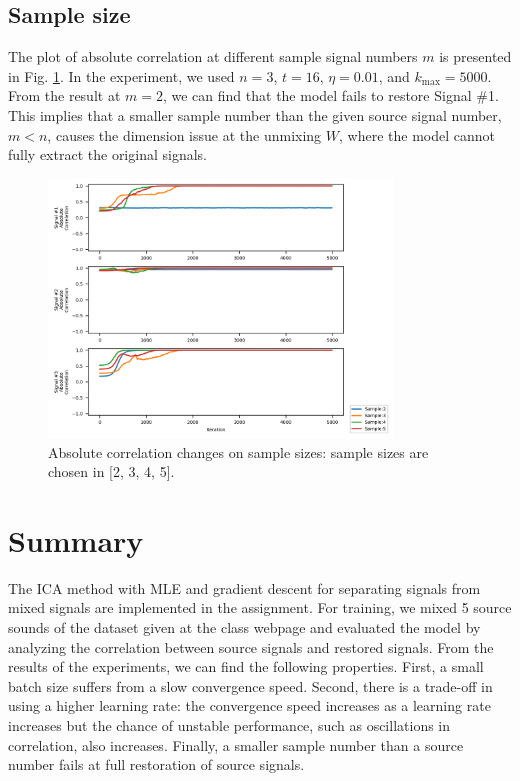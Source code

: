 \documentclass[conference]{IEEEtran}
\begin{document}
\subsection{Sample size}

The plot of absolute correlation at different sample signal numbers $m$ is presented in Fig. \ref{fig:sample_abs_test}.
In the experiment, we used $n=3$, $t=16$, $\eta=0.01$, and $k_{\text{max}} = 5000$.
From the result at $m=2$, we can find that the model fails to restore Signal \#1. This implies that a smaller sample number than the given source signal number, $m<n$, causes the dimension issue at the unmixing $W$, where the model cannot fully extract the original signals.

\begin{figure}[!t]
	\centering
	\includegraphics[width=3.6in]{sample_abs_test.png}	
	\caption{Absolute correlation changes on sample sizes: sample sizes are chosen in [2, 3, 4, 5].}
	\label{fig:sample_abs_test}
\end{figure}


\section{Summary} %

The ICA method with MLE and gradient descent for separating signals from mixed signals are implemented in the assignment. 
For training, we mixed 5 source sounds of the dataset given at the class webpage and evaluated the model by analyzing the correlation between source signals and restored signals.
From the results of the experiments, we can find the following properties.
First, a small batch size suffers from a slow convergence speed.
Second, there is a trade-off in using a higher learning rate: the convergence speed increases as a learning rate increases but the chance of unstable performance, such as oscillations in correlation, also increases.
Finally, a smaller sample number than a source number fails at full restoration of source signals.




\end{document}
